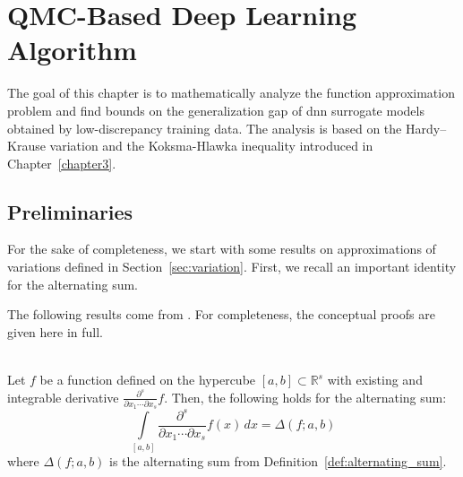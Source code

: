 \chapter{QMC-Based Deep Learning Algorithm}
\label{chapter6}

The goal of this chapter is to mathematically analyze the function approximation
problem and find bounds on the generalization gap of \ac{dnn} surrogate models
obtained by low-discrepancy training data. The analysis is based on the
Hardy--Krause variation and the Koksma-Hlawka inequality introduced in
Chapter~\ref{chapter3}.

\section{Preliminaries}

For the sake of completeness, we start with some results on approximations of
variations defined in Section~\ref{sec:variation}. First, we recall an important
identity for the alternating sum.

The following results come from \cite[Section 9]{owen2005multidimensional}. For
completeness, the conceptual proofs are given here in full.

\begin{prop} \ \\
\label{prop:variation-approximation}
    Let $f$ be a function defined on the hypercube $[a,b]\subset \mathbb{R}^s$
    with existing and integrable derivative $\frac{\partial^s}{\partial x_1
    \cdots \partial x_s} f$. Then, the following holds for the alternating sum:
    \begin{equation}
        \int\limits_{[a,b]} \frac{\partial^s}{\partial x_1 \cdots \partial x_s} 
        f(x) \, dx = \Delta(f;a,b)
    \end{equation}
    where $\Delta(f;a,b)$ is the alternating sum from
    Definition~\ref{def:alternating_sum}.
\end{prop}

